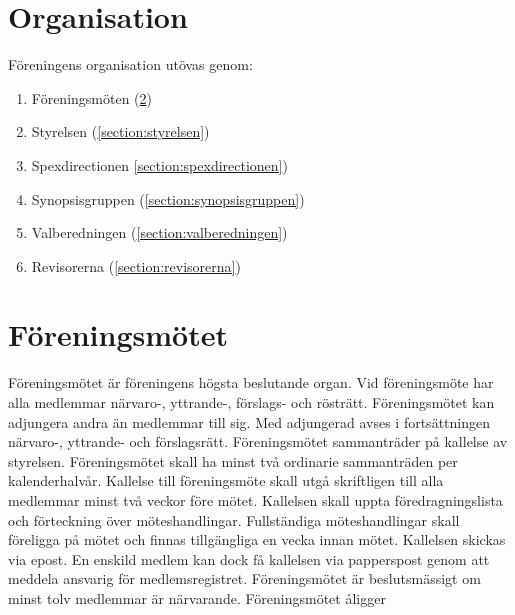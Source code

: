 \documentclass[a4paper]{article}
\begin{document}
\section{Organisation}
Föreningens organisation utövas genom:

\begin{enumerate}
  \item Föreningsmöten (\ref{section:föreningsmötet})
  \item Styrelsen (\ref{section:styrelsen})
  \item Spexdirectionen \ref{section:spexdirectionen})
  \item Synopsisgruppen (\ref{section:synopsisgruppen})
  \item Valberedningen (\ref{section:valberedningen})
  \item Revisorerna (\ref{section:revisorerna})
\end{enumerate}

\section{Föreningsmötet}
\label{section:föreningsmötet}
Föreningsmötet är föreningens högsta beslutande organ.\newline
\newline
Vid föreningsmöte har alla medlemmar närvaro-, yttrande-, förslags- och rösträtt. Föreningsmötet kan adjungera andra än medlemmar till sig. Med adjungerad avses i fortsättningen närvaro-, yttrande- och förslagsrätt.\newline
\newline
Föreningsmötet sammanträder på kallelse av styrelsen. Föreningsmötet skall ha minst två ordinarie sammanträden per kalenderhalvår.\newline
\newline
Kallelse till föreningsmöte skall utgå skriftligen till alla medlemmar minst två veckor före mötet. Kallelsen skall uppta föredragningslista och förteckning över möteshandlingar. Fullständiga möteshandlingar skall föreligga på mötet och finnas tillgängliga en vecka innan mötet.\newline
\newline
Kallelsen skickas via epost. En enskild medlem kan dock få kallelsen via papperspost genom att meddela ansvarig för medlemsregistret.\newline
\newline
Föreningsmötet är beslutsmässigt om minst tolv medlemmar är närvarande.\newline
\newline
Föreningsmötet åligger
\end{document}

